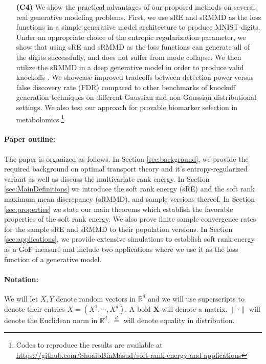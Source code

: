 \documentclass{article}
\theoremstyle{definition}
\begin{document}
\begin{itemize}
    \item[\textbf{(C4)}]  We show the practical advantages of our proposed methods on several real generative modeling problems.  First, we use sRE and sRMMD as the loss functions in a simple generative model architecture to produce MNIST-digits. Under an appropriate choice of the entropic regularization parameter, we show that using sRE and sRMMD  as the loss functions can generate all of the digits successfully, and does not suffer from mode collapse.  We then utilize the sRMMD in a deep generative model in order to produce valid knockoffs \cite{barber2015controlling}. We showcase improved tradeoffs between detection power versus false discovery rate (FDR) compared to other benchmarks of knockoff generation techniques on different Gaussian and non-Gaussian distributional settings.  We also test our approach for provable biomarker selection in metabolomics.\footnote{Codes to reproduce the results are available at \url{https://github.com/ShoaibBinMasud/soft-rank-energy-and-applications}} 
\end{itemize}
\paragraph{Paper outline:}  The paper is organized as follows. In Section \ref{sec:background}, we provide the required background on optimal transport theory and it's entropy-regularized variant as well as discuss the multivariate rank energy. In Section \ref{sec:MainDefinitions} we introduce the soft rank energy (sRE) and the soft rank maximum mean discrepancy (sRMMD), and sample versions thereof.  In Section \ref{sec:properties} we state our main theorems which establish the favorable properties of the soft rank energy. We also prove finite sample convergence rates for the sample sRE and sRMMD to their population versions.  In Section \ref{sec:applications}, we provide extensive simulations to establish soft rank energy as a GoF measure and include two applications where we use it as the loss function of a generative model.

\paragraph{Notation:}


We will let $X,Y$ denote random vectors in $\mathbb{R}^d$ and we will use superscripts to denote their entries $X=(X^1,\cdots, X^d)$. A bold $\mathbf{X}$ will denote a matrix. $\|\cdot\|$ will denote the Euclidean norm in $\mathbb R^d$. $\overset{d}{=}$ will denote equality in distribution.
\end{document}
